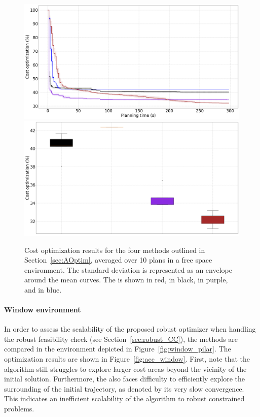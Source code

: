 \begin{figure} [htp]
    \centering
    \includegraphics[width=0.9\linewidth]{figures/accuracy/all_methods_empty.png} \\
    \includegraphics[width=0.9\linewidth]{figures/accuracy/bplot_all_methods_empty.png}
    \caption{Cost optimization results for the four methods outlined in Section~\ref{sec:AOptim}, averaged over 10 plans in a free space environment. 
    The standard deviation is represented as an envelope around the mean curves.
    The  is shown in red,  in black,  in purple, and  in blue.}%
    \label{fig:acc_empty}%
\end{figure}

\paragraph{Window environment}

In order to assess the scalability of the proposed robust optimizer when handling the robust feasibility check (see Section~\ref{sec:robust_CC}), the methods are compared in the environment depicted in Figure~\ref{fig:window_pilar}.
The optimization results are shown in Figure~\ref{fig:acc_window}.
First, note that the  algorithm still struggles to explore larger cost areas beyond the vicinity of the initial solution.
Furthermore, the  also faces difficulty to efficiently explore the surrounding of the initial trajectory, as denoted by its very slow convergence.
This indicates an inefficient scalability of the algorithm to robust constrained problems.

